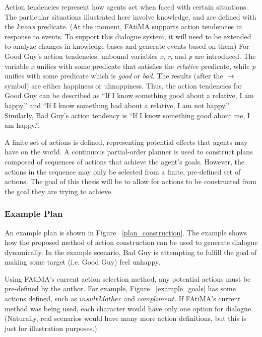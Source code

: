 \documentclass{article}
\begin{document}
Action tendencies represent how agents act when faced with certain
situations.  The particular situations illustrated here involve
knowledge, and are defined with the \emph{knows} predicate.  (At the
moment, FAtiMA supports action tendencies in response to events.  To
support this dialogue system, it will need to be extended to analyze
changes in knowledge bases and generate events based on them)
For Good Guy's action tendencies,
unbound variables \emph{x}, \emph{r}, and \emph{p} are introduced.
The variable \emph{x} unifies with some predicate that satisfies the
\emph{relative} predicate, while \emph{p}
unifies with some predicate which is \emph{good} or \emph{bad}.
The results (after the $\mapsto$ symbol) are either happiness or uhnappiness.  Thus, the
action tendencies for Good Guy can be described as ``If I know something
good about a relative, I am happy.'' and ``If I know something bad about a relative, I
am not happy.''.  Similarly, Bad Guy's action tendency is ``If I know
something good about me, I am happy.''.

A finite set of actions is defined, representing potential effects
that agents may have on the world.  A continuous partial-order planner
\cite{Paiva2005, Russell2003} is used to construct plans composed of
sequences of actions that achieve the agent's goals.  However, the
actions in the sequence may only be selected from a finite,
pre-defined set of actions.  The goal of this thesis will be to allow
for actions to be constructed from the goal they are trying to achieve.

\subsubsection{Example Plan}

An example plan is shown in Figure ~\ref{plan_construction}.
The example shows how the proposed method of action
construction can be used to generate dialogue dynamically.
In the example scenario, Bad Guy is attempting to fulfill the goal
of making some target (i.e. Good Guy) feel unhappy.

Using FAtiMA's current action selection method, any potential
actions must be pre-defined by the author.  For example, Figure
~\ref{example_goals} has some actions defined, such as $insultMother$ and
$compliment$.  If FAtiMA's current method was being used, each
character would have only one option for dialogue.  (Naturally,
real scenarios would have many more action definitions, but this is
just for illustration purposes.)
\end{document}
